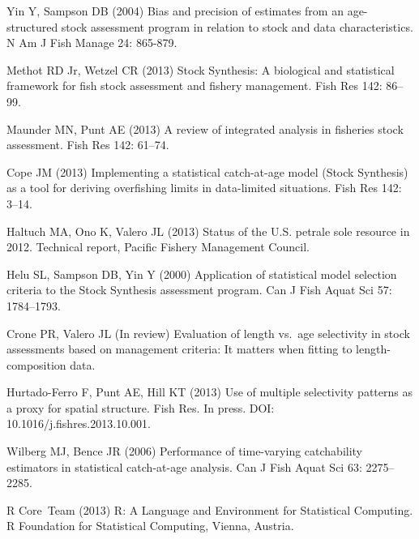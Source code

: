 \documentclass[10pt]{article}
\begin{document}
\begin{thebibliography}{10}
Yin Y, Sampson DB (2004) Bias and precision of estimates from an age-structured
  stock assessment program in relation to stock and data characteristics.
\newblock N Am J Fish Manage 24: 865-879.

Methot RD Jr, Wetzel CR (2013) {Stock Synthesis}: A biological and statistical
  framework for fish stock assessment and fishery management.
\newblock Fish Res 142: 86--99.

Maunder MN, Punt AE (2013) A review of integrated analysis in fisheries stock
  assessment.
\newblock Fish Res 142: 61--74.

Cope JM (2013) Implementing a statistical catch-at-age model ({Stock
  Synthesis}) as a tool for deriving overfishing limits in data-limited
  situations.
\newblock Fish Res 142: 3--14.

Haltuch MA, Ono K, Valero JL (2013) Status of the {U.S.} petrale sole resource
  in 2012.
\newblock Technical report, Pacific Fishery Management Council.

Helu SL, Sampson DB, Yin Y (2000) Application of statistical model selection
  criteria to the {Stock Synthesis} assessment program.
\newblock Can J Fish Aquat Sci 57: 1784--1793.

Crone PR, Valero JL (In review) Evaluation of length vs.~age selectivity in
  stock assessments based on management criteria: It matters when fitting to
  length-composition data.

Hurtado-Ferro F, Punt AE, Hill KT (2013) Use of multiple selectivity patterns
  as a proxy for spatial structure.
\newblock Fish Res. In press. DOI: 10.1016/j.fishres.2013.10.001.

Wilberg MJ, Bence JR (2006) Performance of time-varying catchability estimators
  in statistical catch-at-age analysis.
\newblock Can J Fish Aquat Sci 63: 2275--2285.

\textsf{R} Core~Team (2013) \textsf{R}: A Language and Environment for
  Statistical Computing.
\newblock \textsf{R} Foundation for Statistical Computing, Vienna, Austria.


\end{thebibliography}
\end{document}
